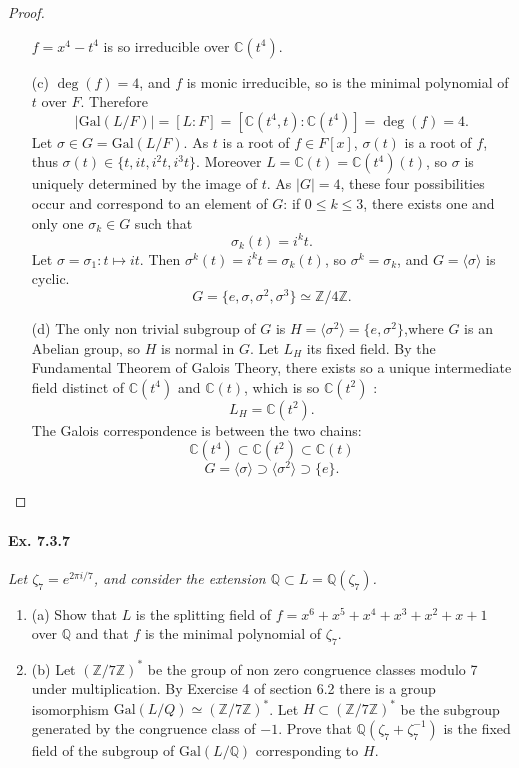 \documentclass[11pt,a4paper]{article}
\newcommand{\be} {\begin{enumerate}}
\newcommand{\ee} {\end{enumerate}}
\newcommand{\Q}{\mathbb{Q}}
\newcommand{\Z}{\mathbb{Z}}
\newcommand{\C}{\mathbb{C}}
\newcommand{\Gal}{\mathrm{Gal}}
\begin{document}
\begin{proof}
\begin{enumerate}
$f = x^4 - t^4$ is so irreducible over $\C(t^4)$.

\item[(c)]
$\deg(f) = 4$, and $f$ is monic irreducible, so is the minimal polynomial of $t$ over $F$. Therefore
$$\vert \Gal(L/F) \vert= [L:F] = [\C(t^4,t):\C(t^4)] = \deg(f) = 4.$$
Let $\sigma \in G = \Gal(L/F)$. As $t$ is a root of $f \in F[x]$, $\sigma(t)$ is a root of $f$, thus $\sigma(t) \in \{t,it,i^2t,i^3t\}$. Moreover $L = \C(t) = \C(t^4)(t)$, so $\sigma$ is uniquely determined by the image of $t$. As $\vert G \vert =4$, these four possibilities occur and correspond to an element of $G$: if $0 \leq k \leq 3$, there exists one and only one $\sigma_k \in G$ such that 
$$\sigma_k(t) = i^k t.$$
Let $\sigma = \sigma_1 : t \mapsto i t$. Then $\sigma^k(t) = i^kt = \sigma_k(t)$, so $\sigma^k = \sigma_k$, and $G = \langle \sigma \rangle$ is cyclic.
$$G = \{e,\sigma,\sigma^2,\sigma^3\} \simeq \Z/4\Z.$$

\item[(d)] The only non trivial subgroup of $G$ is $H = \langle \sigma^2 \rangle = \{e,\sigma^2\}$,where $G$ is an Abelian group, so $H$ is normal in $G$. Let $L_H$ its fixed field.
By the Fundamental Theorem of Galois Theory, there exists so a unique intermediate field distinct of $\C(t^4)$ and $\C(t)$, which is so $\C(t^2)$ :
$$L_H = \C(t^2).$$
The Galois correspondence is between the two chains:
$$ \C(t^4) \subset \C(t^2) \subset \C(t)$$
$$G = \langle \sigma \rangle \supset \langle \sigma^2 \rangle \supset \{e\}.$$

\end{enumerate}
\end{proof}

\paragraph{Ex. 7.3.7}

{\it Let $\zeta_7 = e^{2\pi i/7}$, and consider the extension $\Q \subset L = \Q(\zeta_7)$.
\be
\item[(a)] Show that $L$ is the splitting field of $f = x^6 +x^5 +x^4+x^3+x^2+x+1$ over $\Q$ and that $f$ is the minimal polynomial of $\zeta_7$.
\item[(b)] Let $(\Z/7\Z)^*$ be the group of non zero congruence classes modulo 7 under multiplication. By Exercise 4 of section 6.2 there is a group isomorphism $\Gal(L/Q) \simeq (\Z/7\Z)^*$. Let $H \subset (\Z/7\Z)^*$ be the subgroup generated by the congruence class of $-1$. Prove that $\Q(\zeta_7 + \zeta_7^{-1})$ is the fixed field of the subgroup of $\Gal(L/\Q)$ corresponding to $H$.
\ee
}
\end{document}
